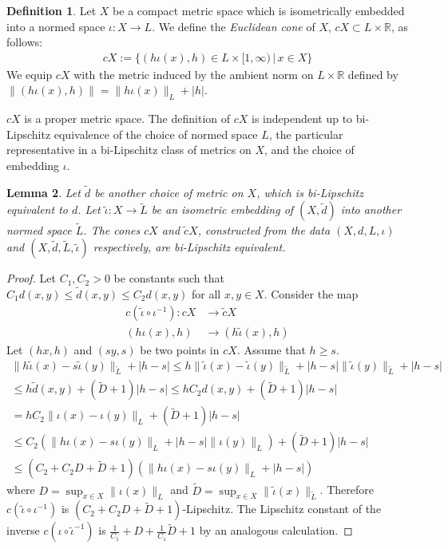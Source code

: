 \documentclass[a4paper,11pt]{article}
\theoremstyle{definition}
\newtheorem{definition}{Definition}[section]
\theoremstyle{plain}
\newtheorem{lemma}[definition]{Lemma}
\theoremstyle{remark}
\begin{document}
\begin{definition} Let $X$ be a compact metric space which is isometrically embedded into a normed space $\iota: X\rightarrow L$. We define the \textit{Euclidean cone} of $X$, $cX \subset L \times \mathbb{R}$, as follows:
\begin{align*}
cX:= \{(h\iota(x),h)\in L \times [1,\infty) \,|\, x\in X\}
\end{align*}We equip $cX$ with the metric induced by the ambient norm on $L\times \mathbb{R}$ defined by $\|(h\iota(x),h)\| = \|h\iota (x)\|_{L}+ |h|$. 
\end{definition}

$cX$ is a proper metric space. The definition of $cX$ is independent up to bi-Lipschitz equivalence of the choice of normed space $L$, the particular representative in a bi-Lipschitz class of metrics on $X$, and the choice of embedding $\iota$. 

\begin{lemma}Let $\tilde{d}$ be another choice of metric on $X$, which is bi-Lipschitz equivalent to $d$. Let $\tilde{\iota}: X\rightarrow \tilde{L}$ be an isometric embedding of $(X,\tilde{d})$ into another normed space $\tilde{L}$. The cones $cX$ and $\tilde{c}X$, constructed from the data $(X,d,L,\iota)$ and $(X,\tilde{d},\tilde{L},\tilde{\iota})$ respectively, are bi-Lipschitz equivalent.  
\end{lemma}

\begin{proof}
Let $C_1,C_2>0$ be constants such that $C_1 d(x,y)\leq \tilde{d}(x,y)\leq C_{2} d(x,y)$ for all $x,y\in X$. Consider the map 
\begin{align*}
c(\tilde{\iota}\circ \iota^{-1}): cX&\rightarrow \tilde{c}X\\
(h\iota(x),h)&\rightarrow (h\tilde{\iota}(x),h)
\end{align*}
Let $(hx,h)$ and $(sy,s)$ be two points in $cX$. Assume that $h\geq s$. 
\begin{align*}
\|h\tilde{\iota}(x)-s\tilde{\iota}(y)\|_{\tilde{L}} + |h-s| \leq h\|\tilde{\iota}(x)-\tilde{\iota}(y)\|_{\tilde{L}} + |h-s| \|\tilde{\iota}(y)\|_{\tilde{L}} + |h-s|\\
\leq h\tilde{d}(x,y)+(\tilde{D}+1) |h-s| \leq hC_{2}d(x,y)+ (\tilde{D}+1)|h-s| \\
= hC_{2}\|\iota(x)-\iota(y)\|_{L} + (\tilde{D}+1)|h-s| \\
\leq C_2 (\|h\iota(x)-s\iota(y)\|_{L} + |h-s| \|\iota(y)\|_{L}) + (\tilde{D}+1) |h-s|\\
\leq (C_{2} + C_{2}D+\tilde{D} +1)(\|h\iota(x)-s\iota(y)\|_{L} + |h-s|)
\end{align*}
where $D = \sup_{x\in X} \|\iota(x)\|_{L}$ and $\tilde{D} = \sup_{x\in X} \|\tilde{\iota}(x)\|_{\tilde{L}}$. Therefore $c(\tilde{\iota}\circ \iota^{-1})$ is $(C_{2} + C_{2}D+\tilde{D} +1)$-Lipschitz. The Lipschitz constant of the inverse $c(\iota\circ \tilde{\iota}^{-1})$ is $\frac{1}{C_{1}} + D+ \frac{1}{C_{1}} \tilde{D}+1$ by an analogous calculation. 
\end{proof}
\end{document}

